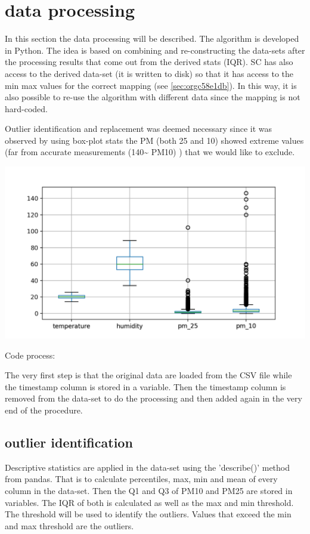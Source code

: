 \documentclass[11pt]{article}
\begin{document}
\section{data processing}
\label{sec:orgf0fd5a6}
In this section the data processing will be described.  The algorithm is developed in Python.  The idea is based on combining and re-constructing the data-sets after the processing results that come out from the derived stats (IQR).  SC has also access to the derived data-set (it is written to disk) so that it has access to the min max values for the correct mapping (see \ref{sec:orgc58e1db}).  In this way, it is also possible to re-use the algorithm with different data since the mapping is not hard-coded.

Outlier identification and replacement was deemed necessary since it was observed by using box-plot stats the PM (both 25 and 10) showed extreme values (far from accurate measurements (140\textasciitilde{} PM10) ) that we would like to exclude.

\begin{center}
\includegraphics[width=.9\linewidth]{./boxplot.png}
\end{center}

Code process:

The very first step is that the original data are loaded from the CSV file while the timestamp column is stored in a variable.  Then the timestamp column is removed from the data-set to do the processing and then added again in the very end of the procedure.

\subsection{outlier identification}
\label{sec:org6d2cf98}
Descriptive statistics are applied in the data-set using the 'describe()' method from pandas.  That is to calculate percentiles, max, min and mean of every column in the data-set.  Then the Q1 and Q3 of PM10 and PM25 are stored in variables.  The IQR of both is calculated as well as the max and min threshold.  The threshold will be used to identify the outliers.  Values that exceed the min and max threshold are the outliers.
\end{document}
